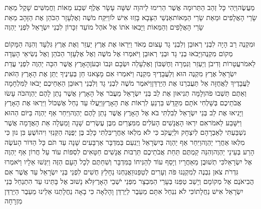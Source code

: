 \documentclass[../main/main.tex]{subfiles}
\begin{document}
\begin{multicols*}{\ncols}
מַעֲשֶׂה\PreVerseSpace{}וַיְהִי כָּל זְהַב הַתְּרוּמָה אֲשֶׁר הֵרִימוּ לַיהוָה שִׁשָּׁה עָשָׂר אֶלֶף שְׁבַע מֵאוֹת וַחֲמִשִּׁים שָׁקֶל מֵאֵת שָׂרֵי הָאֲלָפִים וּמֵאֵת שָׂרֵי הַמֵּאוֹת\PreVerseSpace{}אַנְשֵׁי הַצָּבָא בָּזְזוּ אִישׁ לוֹ\PreVerseSpace{}וַיִּקַּח מֹשֶׁה וְאֶלְעָזָר הַכֹּהֵן אֶת הַזָּהָב מֵאֵת שָׂרֵי הָאֲלָפִים וְהַמֵּאוֹת וַיָּבִאוּ אֹתוֹ אֶל אֹהֶל מוֹעֵד זִכָּרוֹן לִבְנֵי יִשְׂרָאֵל לִפְנֵי יַהְוֶה\OpenSection{}\par
{}וּמִקְנֶה רַב הָיָה לִבְנֵי רְאוּבֵן וְלִבְנֵי גָד עָצוּם מְאֹד וַיִּרְאוּ אֶת אֶרֶץ יַעְזֵר וְאֶת אֶרֶץ גִּלְעָד וְהִנֵּה הַמָּקוֹם מְקוֹם מִקְנֶה\PreVerseSpace{}וַיָּבֹאוּ בְנֵי גָד וּבְנֵי רְאוּבֵן וַיֹּאמְרוּ אֶל מֹשֶׁה וְאֶל אֶלְעָזָר הַכֹּהֵן וְאֶל נְשִׂיאֵי הָעֵדָה לֵאמֹר\PreVerseSpace{}עֲטָרוֹת וְדִיבֹן וְיַעְזֵר וְנִמְרָה וְחֶשְׁבּוֹן וְאֶלְעָלֵה וּשְׂבָם וּנְבוֹ וּבְעֹן\PreVerseSpace{}הָאָרֶץ אֲשֶׁר הִכָּה יַהְוֶה לִפְנֵי עֲדַת יִשְׂרָאֵל אֶרֶץ מִקְנֶה הוּא וְלַעֲבָדֶיךָ מִקְנֶה \ClosedSection{}וַיֹּאמְרוּ אִם מָצָאנוּ חֵן בְּעֵינֶיךָ יֻתַּן אֶת הָאָרֶץ הַזֹּאת לַעֲבָדֶיךָ לַאֲחֻזָּה אַל תַּעֲבִרֵנוּ אֶת הַיַּרְדֵּן\PreVerseSpace{}וַיֹּאמֶר מֹשֶׁה לִבְנֵי גָד וְלִבְנֵי רְאוּבֵן הַאַחֵיכֶם יָבֹאוּ לַמִּלְחָמָה וְאַתֶּם תֵּשְׁבוּ פֹה\PreVerseSpace{}וְלָמָּה תְנִיאוּן\SubEnd{} אֶת לֵב בְּנֵי יִשְׂרָאֵל מֵעֲבֹר אֶל הָאָרֶץ אֲשֶׁר נָתַן לָהֶם יַהְוֶה\PreVerseSpace{}כֹּה עָשׂוּ אֲבֹתֵיכֶם בְּשָׁלְחִי אֹתָם מִקָּדֵשׁ בַּרְנֵעַ לִרְאוֹת אֶת הָאָרֶץ\PreVerseSpace{}וַיַּעֲלוּ עַד נַחַל אֶשְׁכּוֹל וַיִּרְאוּ אֶת הָאָרֶץ וַיָּנִיאוּ אֶת לֵב בְּנֵי יִשְׂרָאֵל לְבִלְתִּי בֹא אֶל הָאָרֶץ אֲשֶׁר נָתַן לָהֶם יַהְוֶה\PreVerseSpace{}וַיִּחַר אַף יַהְוֶה בַּיּוֹם הַהוּא וַיִּשָּׁבַע לֵאמֹר\PreVerseSpace{}אִם יִרְאוּ הָאֲנָשִׁים הָעֹלִים מִמִּצְרַיִם מִבֶּן עֶשְׂרִים שָׁנָה וָמַעְלָה אֵת הָאֲדָמָה אֲשֶׁר נִשְׁבַּעְתִּי לְאַבְרָהָם לְיִצְחָק וּלְיַעֲקֹב כִּי לֹא מִלְאוּ אַחֲרָי\PreVerseSpace{}בִּלְתִּי כָּלֵב בֶּן יְפֻנֶּה הַקְּנִזִּי וִיהוֹשֻׁעַ בִּן נוּן כִּי מִלְאוּ אַחֲרֵי יַהְוֶה\PreVerseSpace{}וַיִּחַר אַף יַהְוֶה בְּיִשְׂרָאֵל וַיְנִעֵם בַּמִּדְבָּר אַרְבָּעִים שָׁנָה עַד תֹּם כָּל הַדּוֹר הָעֹשֶׂה הָרַע בְּעֵינֵי יַהְוֶה\PreVerseSpace{}וְהִנֵּה קַמְתֶּם תַּחַת אֲבֹתֵיכֶם תַּרְבּוּת אֲנָשִׁים חַטָּאִים לִסְפּוֹת עוֹד עַל חֲרוֹן אַף יַהְוֶה אֶל יִשְׂרָאֵל\PreVerseSpace{}כִּי תְשׁוּבֻן מֵאַחֲרָיו וְיָסַף עוֹד לְהַנִּיחוֹ בַּמִּדְבָּר וְשִׁחַתֶּם לְכָל הָעָם הַזֶּה \ClosedSection{}וַיִּגְּשׁוּ אֵלָיו וַיֹּאמְרוּ גִּדְרֹת צֹאן נִבְנֶה לְמִקְנֵנוּ פֹּה וְעָרִים לְטַפֵּנוּ\PreVerseSpace{}וַאֲנַחְנוּ נֵחָלֵץ חֻשִׁים לִפְנֵי בְּנֵי יִשְׂרָאֵל עַד אֲשֶׁר אִם הֲבִיאֹנֻם אֶל מְקוֹמָם וְיָשַׁב טַפֵּנוּ בְּעָרֵי הַמִּבְצָר מִפְּנֵי יֹשְׁבֵי הָאָרֶץ\PreVerseSpace{}לֹא נָשׁוּב אֶל בָּתֵּינוּ עַד הִתְנַחֵל בְּנֵי יִשְׂרָאֵל אִישׁ נַחֲלָתוֹ\PreVerseSpace{}כִּי לֹא נִנְחַל אִתָּם מֵעֵבֶר לַיַּרְדֵּן וָהָלְאָה כִּי בָאָה נַחֲלָתֵנוּ אֵלֵינוּ מֵעֵבֶר הַיַּרְדֵּן מִזְרָחָה\OpenSection{}\par

\end{multicols*}
\end{document}
